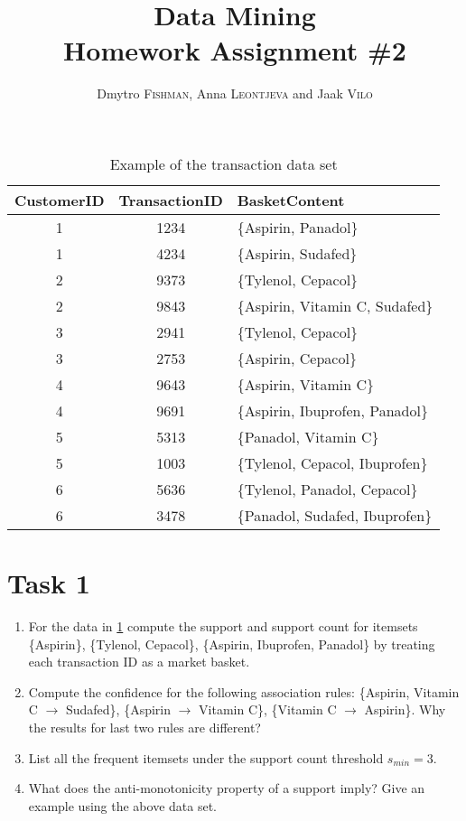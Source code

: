 \documentclass{article}
\title{Data Mining\\Homework Assignment \#2} %
\author{Dmytro \textsc{Fishman}, Anna \textsc{Leontjeva} and Jaak \textsc{Vilo}} %
\begin{document}
\maketitle %
\begin{table}[h]
\caption{Example of the transaction data set}
\label{tab:toyexample}
\begin{center}
    \begin{tabular}{| c | c | l|}
    \hline
    CustomerID & TransactionID& BasketContent \\ \hline
    	1 & 1234 & \{Aspirin, Panadol\}\\ \hline
    	1 & 4234 & \{Aspirin, Sudafed\}\\ \hline
    	2 & 9373& \{Tylenol, Cepacol\}\\ \hline
	2 & 9843& \{Aspirin, Vitamin C, Sudafed\}\\ \hline 
	3 & 2941& \{Tylenol, Cepacol\}\\ \hline  
	3 & 2753& \{Aspirin, Cepacol\}\\ \hline
	4 & 9643& \{Aspirin, Vitamin C\}\\ \hline
	4 & 9691& \{Aspirin, Ibuprofen, Panadol\}\\ \hline
	5 & 5313& \{Panadol, Vitamin C\}\\ \hline
	5 & 1003& \{Tylenol, Cepacol, Ibuprofen\}\\ \hline
	6 & 5636& \{Tylenol, Panadol, Cepacol\}\\ \hline
	6 & 3478& \{Panadol, Sudafed, Ibuprofen\}\\ \hline
 \end{tabular}
\end{center}
\end{table}
\section*{Task 1}
\begin{enumerate}
\item For the data in \ref{tab:toyexample} compute the support and support count for itemsets \{Aspirin\}, \{Tylenol, Cepacol\}, \{Aspirin, Ibuprofen, Panadol\} by treating each transaction ID as a market basket.
\item Compute the confidence for the following association rules: \{Aspirin, Vitamin C $\rightarrow$ Sudafed\}, \{Aspirin $\rightarrow$ Vitamin C\}, \{Vitamin C $\rightarrow$ Aspirin\}. Why the results for last two rules are different?
\item List all the frequent itemsets under the support count threshold $s_{min} = 3$.
\item What does the anti-monotonicity property of a support imply? Give an example using the above data set. 
\end{enumerate}
\end{document}
